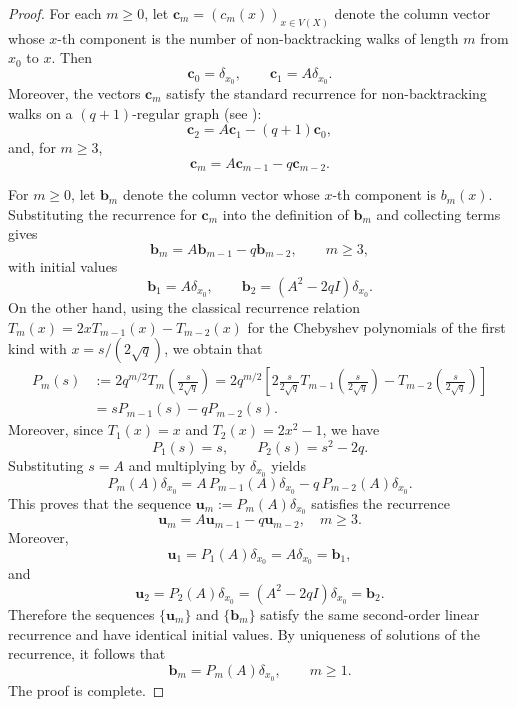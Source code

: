 \documentclass[reqno,10pt]{amsart}
\theoremstyle{definition}
\numberwithin{equation}{section}
\begin{document}
\begin{proof}
For each $m\ge0$, let $\mathbf c_m=(c_m(x))_{x\in V(X)}$
denote the column vector whose $x$-th component is the number of non-backtracking walks of length $m$ from $x_0$ to $x$. Then
\[
\mathbf c_0=\delta_{x_0},
\qquad
\mathbf c_1=A\delta_{x_0}.
\]
Moreover, the vectors $\mathbf c_m$ satisfy the standard recurrence for
non-backtracking walks on a $(q+1)$-regular graph (see
\cite[Section~2.1]{CHJSV}):
\[
\mathbf c_2=A\mathbf c_1-(q+1)\mathbf c_0,
\]
and, for $m\ge3$,
\[
\mathbf c_m
=
A\mathbf c_{m-1}
-
q\mathbf c_{m-2}.
\]

\noindent
For $m\ge 0$, let $\mathbf b_m$ denote the column vector whose $x$-th component is $b_m(x)$.
Substituting the recurrence for $\mathbf c_m$ into the definition of
$\mathbf b_m$ and collecting terms gives
\[
\mathbf b_m
=
A\mathbf b_{m-1}
-
q\mathbf b_{m-2},
\qquad m\ge3,
\]
with initial values
\[
\mathbf b_1=A\delta_{x_0},
\qquad
\mathbf b_2=(A^2-2qI)\delta_{x_0}.
\]
On the other hand, using the classical recurrence relation $T_m(x)=2xT_{m-1}(x)-T_{m-2}(x)$  \cite[formula 8.941.1]{GR07} for the Chebyshev polynomials of the first kind with
$x=s/(2\sqrt q)$, we obtain that
\[
\begin{split}
P_m(s)
&:=2q^{m/2}T_m\!\left(\frac{s}{2\sqrt q}\right)=2q^{m/2}
\left[
2\frac{s}{2\sqrt q}
T_{m-1}\!\left(\frac{s}{2\sqrt q}\right)
-
T_{m-2}\!\left(\frac{s}{2\sqrt q}\right)
\right]\\
&=sP_{m-1}(s)-qP_{m-2}(s).
\end{split}
\]
Moreover, since $T_1(x)=x$ and $T_2(x)=2x^2-1$, we have
\[
P_1(s)=s,
\qquad
P_2(s)=s^2-2q.
\]
Substituting $s=A$ and multiplying by $\delta_{x_0}$ yields
\[
P_m(A)\delta_{x_0}
=
A\,P_{m-1}(A)\delta_{x_0}
-
q\,P_{m-2}(A)\delta_{x_0}.
\]
This proves that the sequence $\mathbf u_m:=P_m(A)\delta_{x_0}$ satisfies the recurrence
\[
\mathbf u_m
=
A\mathbf u_{m-1}
-
q\mathbf u_{m-2},\quad m\ge 3.
\]
Moreover,
\[
\mathbf u_1
=
P_1(A)\delta_{x_0}
=
A\delta_{x_0}
=
\mathbf b_1,
\]
and
\[
\mathbf u_2
=
P_2(A)\delta_{x_0}
=
(A^2-2qI)\delta_{x_0}
=
\mathbf b_2.
\]
Therefore the sequences $\{\mathbf u_m\}$ and $\{\mathbf b_m\}$
satisfy the same second-order linear recurrence and have identical
initial values. By uniqueness of solutions of the recurrence, it follows that
\[
\mathbf b_m=P_m(A)\delta_{x_0},
\qquad m\ge1.
\]
The proof is complete.
\end{proof}
\end{document}
